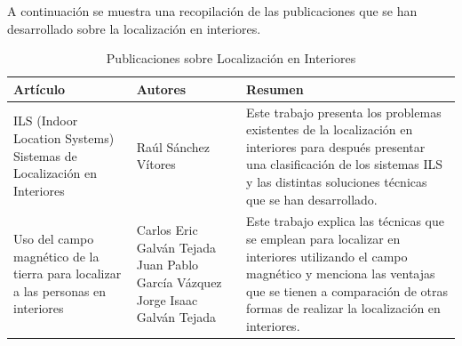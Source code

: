 \newpage
A continuación se muestra una recopilación de las publicaciones que se han desarrollado sobre la localización en interiores.

\begin{table}[h] 
	\begin{center}
		\begin{tabular}{|p{4cm}|p{4.5cm}|p{4.5cm}|}
			\hline Artículo	 &
				Autores &
					Resumen \\
			\hline ILS (Indoor Location Systems) Sistemas de Localización en Interiores &
				Raúl Sánchez Vítores &
					Este trabajo presenta los problemas existentes de la localización en interiores para después presentar una clasificación de los sistemas ILS y las distintas soluciones técnicas que se han desarrollado. \\
      		\hline Uso del campo magnético de la tierra para localizar a las personas en interiores &
      			Carlos Eric Galván Tejada \newline
				Juan Pablo García Vázquez \newline
				Jorge Isaac Galván Tejada &
      				Este trabajo explica las técnicas que se emplean para localizar en interiores utilizando el campo magnético y menciona las ventajas que se tienen a comparación de otras formas de realizar la localización en interiores. \\
      		\hline 
		\end{tabular}
	\end{center}
	\caption[Publicaciones sobre Localización en Interiores]{Publicaciones sobre Localización en Interiores} 
	\label{tab:publicacionesInteriores}
\end{table}



